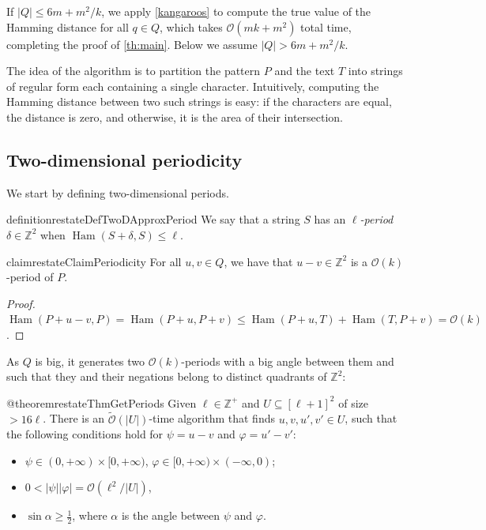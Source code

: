 \documentclass[twoside,leqno]{article}
\newcommand{\Z}{\mathbb{Z}}
\renewcommand{\O}{\mathcal{O}}
\newcommand{\tO}{\tilde{\mathcal{O}}}
\renewcommand{\phi}{\varphi}
\DeclareMathOperator*{\Ham}{Ham}
\newcommand{\absolute}[1]{\left\lvert#1\right\rvert}
\begin{document}
If $\absolute{Q} \le 6m + m^2/k$, we apply \cref{kangaroos} to compute the true value of the Hamming distance for all $q \in Q$, which takes $\O(mk+m^2)$ total time, completing the proof of \cref{th:main}. Below we assume $\absolute{Q} > 6m + m^2/k$. 

The idea of the algorithm is to partition the pattern $P$ and the text $T$ into strings of regular form each containing a single character. Intuitively, computing the Hamming distance between two such strings is easy: if the characters are equal, the distance is zero, and otherwise, it is the area of their intersection.

\subsection{Two-dimensional periodicity} \label{periodicity_section}
We start by defining two-dimensional periods.



\begin{restatable*}{definition}{restateDefTwoDApproxPeriod}
We say that a string $S$ has an \emph{$\ell$-period} $\delta \in \Z^2$ when $\Ham(S + \delta, S) \le \ell$.
\end{restatable*}

\begin{restatable*}{claim}{restateClaimPeriodicity} \label{periodicity_lemma}
For all $u, v \in Q$, we have that $u - v \in \Z^2$ is a $\O(k)$-period of $P$.
\end{restatable*}	
\begin{proof}
$\Ham(P + u - v, P) = \Ham(P + u, P + v) \le \Ham(P + u, T) + \Ham(T,P + v) = \O(k)$.
\end{proof}


As $Q$ is big, it generates two $\O(k)$-periods with a big angle between them and such that they and their negations belong to distinct quadrants of $\Z^2$: 

\begin{restatable*}{@theorem}{restateThmGetPeriods}\label{get_periods}
Given $\ell \in \Z^+$ and $U \subseteq [\ell + 1]^2$ of size $> 16\ell$. There is an $\tO(\absolute{U})$-time algorithm that finds $u, v, u', v' \in U$, such that the following conditions hold for $\psi = u - v$ and $\phi = u' - v'$:
	\begin{itemize}
		\item $\psi \in (0, +\infty) \times [0, +\infty)$, $\phi \in [0, +\infty) \times (-\infty, 0)$;
		\item $0 < \absolute{\psi}\absolute{\phi} = \O(\ell^2 / \absolute{U})$,
		\item $\sin \alpha \ge \frac{1}{2}$, where $\alpha$ is the angle between $\psi$ and $\phi$.
	\end{itemize}
\end{restatable*}
\end{document}
